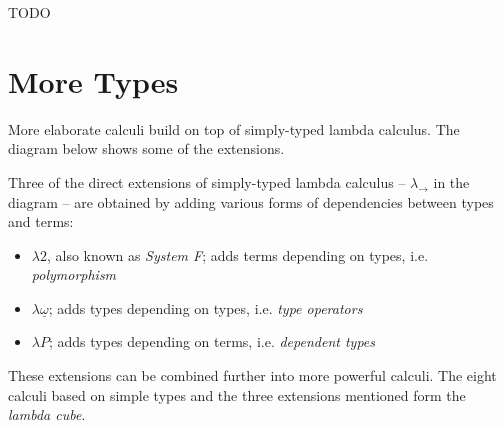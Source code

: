 \documentclass[11pt,twoside,a4paper]{article} %
\begin{document}
TODO

\section{More Types}

More elaborate calculi build on top of simply-typed lambda calculus. The
diagram below shows some of the extensions.


Three of the direct extensions of simply-typed lambda calculus -- $\lambda_\rightarrow$ in the
diagram -- are obtained by adding various forms of dependencies between types
and terms:
\begin{itemize}
\item $\lambda 2$, also known as \emph{System F}; adds terms depending on
types, i.e. \emph{polymorphism}
\item $\lambda\underline{\omega}$; adds types depending on types, i.e. \emph{type
operators}
\item $\lambda P$; adds types depending on terms, i.e. \emph{dependent types}
\end{itemize}
These extensions can be combined further into more powerful calculi. The eight
calculi based on simple types and the three extensions mentioned form the
\emph{lambda cube}\cite{b91}.
\end{document}
